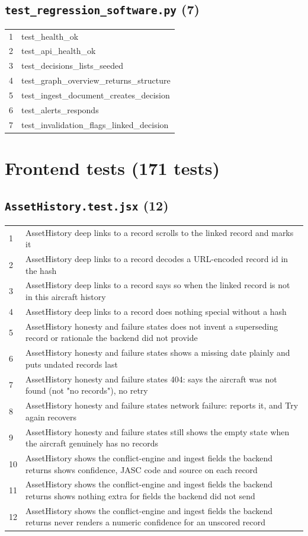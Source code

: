 \subsection*{\texttt{test\_regression\_software.py} (7)}
\begin{longtable}{p{}p{}}
1 & test\_health\_ok \\
2 & test\_api\_health\_ok \\
3 & test\_decisions\_lists\_seeded \\
4 & test\_graph\_overview\_returns\_structure \\
5 & test\_ingest\_document\_creates\_decision \\
6 & test\_alerts\_responds \\
7 & test\_invalidation\_flags\_linked\_decision \\
\end{longtable}
\normalsize
\section{Frontend tests (171 tests)}\label{app:tests-frontend}
\small
\subsection*{\texttt{AssetHistory.test.jsx} (12)}
\begin{longtable}{p{}p{}}
1 & AssetHistory deep links to a record scrolls to the linked record and marks it \\
2 & AssetHistory deep links to a record decodes a URL-encoded record id in the hash \\
3 & AssetHistory deep links to a record says so when the linked record is not in this aircraft history \\
4 & AssetHistory deep links to a record does nothing special without a hash \\
5 & AssetHistory honesty and failure states does not invent a superseding record or rationale the backend did not provide \\
6 & AssetHistory honesty and failure states shows a missing date plainly and puts undated records last \\
7 & AssetHistory honesty and failure states 404: says the aircraft was not found (not "no records"), no retry \\
8 & AssetHistory honesty and failure states network failure: reports it, and Try again recovers \\
9 & AssetHistory honesty and failure states still shows the empty state when the aircraft genuinely has no records \\
10 & AssetHistory shows the conflict-engine and ingest fields the backend returns shows confidence, JASC code and source on each record \\
11 & AssetHistory shows the conflict-engine and ingest fields the backend returns shows nothing extra for fields the backend did not send \\
12 & AssetHistory shows the conflict-engine and ingest fields the backend returns never renders a numeric confidence for an unscored record \\
\end{longtable}
